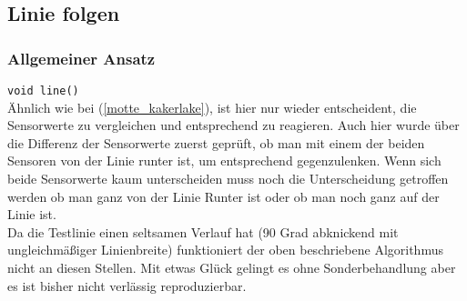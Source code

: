 \subsection{Linie folgen}
\label{linie_folgen}

\subsubsection{Allgemeiner Ansatz}

\verb+void line()+\\

Ähnlich wie bei  (\ref{motte_kakerlake}), ist hier nur wieder entscheident, die Sensorwerte zu vergleichen und entsprechend zu reagieren. Auch hier wurde über die Differenz der Sensorwerte zuerst geprüft, ob man mit einem der beiden Sensoren von der Linie runter ist, um entsprechend gegenzulenken. Wenn sich beide Sensorwerte kaum unterscheiden muss noch die Unterscheidung getroffen werden ob man ganz von der Linie Runter ist oder ob man noch ganz auf der Linie ist.
\\
Da die Testlinie einen seltsamen Verlauf hat (90 Grad abknickend mit ungleichmäßiger Linienbreite) funktioniert der oben beschriebene Algorithmus nicht an diesen Stellen. Mit etwas Glück gelingt es ohne Sonderbehandlung aber es ist bisher nicht verlässig reproduzierbar.

